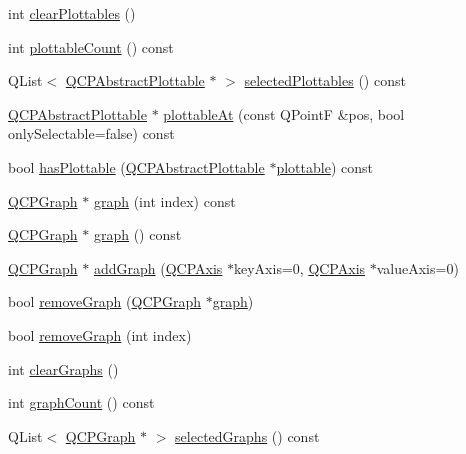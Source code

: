 \begin{DoxyCompactItemize}
int \hyperlink{class_q_custom_plot_a9a409bb3201878adb7ffba1c89c4e004}{clear\+Plottables} ()
\item 
int \hyperlink{class_q_custom_plot_a2dbfbf15dc38713f9a1c445a3dd2e989}{plottable\+Count} () const 
\item 
Q\+List$<$ \hyperlink{class_q_c_p_abstract_plottable}{Q\+C\+P\+Abstract\+Plottable} $\ast$ $>$ \hyperlink{class_q_custom_plot_a6721b8c689bb7f2f400987e580508fe8}{selected\+Plottables} () const 
\item 
\hyperlink{class_q_c_p_abstract_plottable}{Q\+C\+P\+Abstract\+Plottable} $\ast$ \hyperlink{class_q_custom_plot_ac1d1bc6ae4e13616fb02cef6d9e2188e}{plottable\+At} (const Q\+Point\+F \&pos, bool only\+Selectable=false) const 
\item 
bool \hyperlink{class_q_custom_plot_a4fc28914e2ee91aab424b7ce46b6bdf1}{has\+Plottable} (\hyperlink{class_q_c_p_abstract_plottable}{Q\+C\+P\+Abstract\+Plottable} $\ast$\hyperlink{class_q_custom_plot_a32de81ff53e263e785b83b52ecd99d6f}{plottable}) const 
\item 
\hyperlink{class_q_c_p_graph}{Q\+C\+P\+Graph} $\ast$ \hyperlink{class_q_custom_plot_a6d3ed93c2bf46ab7fa670d66be4cddaf}{graph} (int index) const 
\item 
\hyperlink{class_q_c_p_graph}{Q\+C\+P\+Graph} $\ast$ \hyperlink{class_q_custom_plot_a80c40ced2a74eefe9e92de1e82ba2274}{graph} () const 
\item 
\hyperlink{class_q_c_p_graph}{Q\+C\+P\+Graph} $\ast$ \hyperlink{class_q_custom_plot_a6fb2873d35a8a8089842d81a70a54167}{add\+Graph} (\hyperlink{class_q_c_p_axis}{Q\+C\+P\+Axis} $\ast$key\+Axis=0, \hyperlink{class_q_c_p_axis}{Q\+C\+P\+Axis} $\ast$value\+Axis=0)
\item 
bool \hyperlink{class_q_custom_plot_a903561be895fb6528a770d66ac5e6713}{remove\+Graph} (\hyperlink{class_q_c_p_graph}{Q\+C\+P\+Graph} $\ast$\hyperlink{class_q_custom_plot_a6d3ed93c2bf46ab7fa670d66be4cddaf}{graph})
\item 
bool \hyperlink{class_q_custom_plot_a9554b3d2d5b10c0f884bd4010b6c192c}{remove\+Graph} (int index)
\item 
int \hyperlink{class_q_custom_plot_ab0f3abff2d2f7df3668b5836f39207fa}{clear\+Graphs} ()
\item 
int \hyperlink{class_q_custom_plot_a7d9b4d19114b2fde60f0233eeb0aa682}{graph\+Count} () const 
\item 
Q\+List$<$ \hyperlink{class_q_c_p_graph}{Q\+C\+P\+Graph} $\ast$ $>$ \hyperlink{class_q_custom_plot_ad2a0493bdd01e7aa99a4209ae3a5b67b}{selected\+Graphs} () const 

\end{DoxyCompactItemize}
